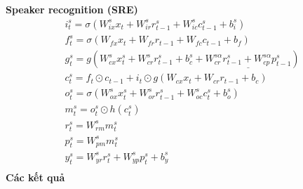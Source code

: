 \documentclass{article}
\begin{document}
	\textbf{Speaker recognition (SRE)}
	\begin{gather*}
		i^{s}_t = \sigma(W^{s}_{ix}x_t + W^{s}_{ir}r^{s}_{t-1} + W^{s}_{ic}c^{s}_{t-1}+b^{s}_i)\\
		f^{s}_t = \sigma(W_{fx}x_t + W_{fr}r_{t-1} + W_{fc}c_{t-1}+b_f)\\
		g^{s}_t = g(W^{s}_{cx}x^{s}_t + W^{s}_{cr}r^{s}_{t-1} + b^{s}_{c} + \underline{W^{s\alpha}_{cr}r^{s}_{t-1} + W^{s\alpha}_{cp}p^{s}_{t-1}})\\
		c^{s}_t = f_t \odot c_{t-1} + i_t \odot g(W_{cx}x_t + W_{cr}r_{t-1} + b_c)\\
		o^{s}_t = \sigma(W^{s}_{ox}x^{s}_t + W^{s}_{or}r^{s}_{t-1} + W^{s}_{oc}c^{s}_t + b^{s}_o)\\
		m^{s}_t = o^{s}_t \odot h(c^{s}_t)\\
		r^{s}_t = W^{s}_{rm}m^{s}_t\\
		p^{s}_t = W^{s}_{pm}m^{s}_t\\
		y^{s}_t = W^{s}_{yr}r^{s}_t + W^{s}_{yp}p^{s}_t + b^{s}_y\\
	\end{gather*}
	\textbf{Các kết quả}
\end{document}
